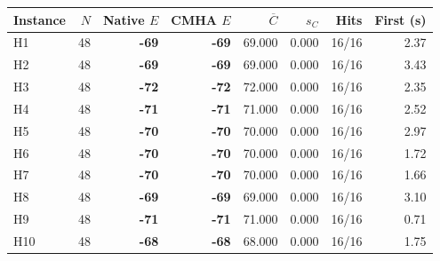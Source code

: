 \begin{tabular}{@{}lrrrrrrr@{}}
\toprule
Instance & $N$ & Native $E$ & CMHA $E$ & $\overline C$ & $s_C$ & Hits & First (s) \\
\midrule
H1 & 48 & \textbf{-69} & \textbf{-69} & 69.000 & 0.000 & 16/16 & 2.37 \\
H2 & 48 & \textbf{-69} & \textbf{-69} & 69.000 & 0.000 & 16/16 & 3.43 \\
H3 & 48 & \textbf{-72} & \textbf{-72} & 72.000 & 0.000 & 16/16 & 2.35 \\
H4 & 48 & \textbf{-71} & \textbf{-71} & 71.000 & 0.000 & 16/16 & 2.52 \\
H5 & 48 & \textbf{-70} & \textbf{-70} & 70.000 & 0.000 & 16/16 & 2.97 \\
H6 & 48 & \textbf{-70} & \textbf{-70} & 70.000 & 0.000 & 16/16 & 1.72 \\
H7 & 48 & \textbf{-70} & \textbf{-70} & 70.000 & 0.000 & 16/16 & 1.66 \\
H8 & 48 & \textbf{-69} & \textbf{-69} & 69.000 & 0.000 & 16/16 & 3.10 \\
H9 & 48 & \textbf{-71} & \textbf{-71} & 71.000 & 0.000 & 16/16 & 0.71 \\
H10 & 48 & \textbf{-68} & \textbf{-68} & 68.000 & 0.000 & 16/16 & 1.75 \\
\bottomrule
\end{tabular}
